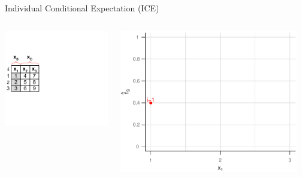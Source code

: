 \documentclass[11pt,compress,t,notes=noshow, aspectratio=169, xcolor=table]{beamer}
\begin{document}
\begin{vbframe}{Individual Conditional Expectation (ICE)}
\begin{columns}[T]
\begin{column}{0.45\textwidth}
\includegraphics[page=3, trim=0cm 0.35cm 0.85cm 0.35cm, width=\textwidth]{figure_man/ice_plot_demo}
\end{column}
\begin{column}{0.55\textwidth}
\includegraphics[page=1, width=0.95\textwidth]{figure/ICE}
\end{column}
\end{columns}
\vspace*{\topsep}


\end{vbframe}
\end{document}
